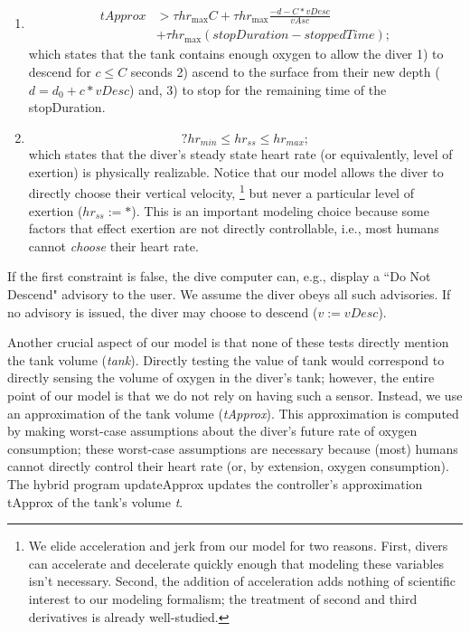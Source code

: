 \documentclass[sigconf,screen]{acmart}
\newcommand{\varheart}{hr}
\newcommand{\vDesc}{\textit{vDesc}}
\newcommand{\vAsc}{\textit{vAsc}}
\newcommand{\tApprox}{\textit{tApprox}}
\newcommand{\iitimes}{{*}}
\begin{document}
\begin{enumerate}
\item 
\begin{align*}
\tApprox &>\tau \varheart_{\text{max}} C + \tau \varheart_{\text{max}}\frac{-d - C \iitimes \vDesc}{\vAsc} \\ &+ \tau \varheart_{\text{max}}(stopDuration - stoppedTime);
\end{align*}
which states that the tank contains enough oxygen to allow the diver
1) to descend for $c \le C$ seconds
2) ascend to the surface from their new depth ($d = d_0 + c\iitimes\vDesc$) and,
3) to stop for the remaining time of the stopDuration.

\item 
$$
?\varheart_{min} \le \varheart_{ss} \le \varheart_{max};
$$
which states that the diver's steady state heart rate (or equivalently, level of exertion) is physically realizable. 
Notice that our model allows the diver to directly choose their vertical velocity,
\footnote[1]{We elide  acceleration and jerk from our model for two reasons.
First, divers can accelerate and decelerate quickly enough that modeling these variables isn't necessary. Second, the addition of acceleration adds nothing of scientific interest to our modeling formalism; the treatment of second and third derivatives is already well-studied.}
but never a particular level of exertion ($\varheart_{ss} := *$).
This is an important modeling choice because some factors
that effect exertion are not directly controllable, i.e., most humans cannot \emph{choose} their heart rate.
\end{enumerate}
If the first constraint is false, the dive computer can, e.g., display a ``Do Not Descend" advisory to the user.
We assume the diver obeys all such advisories. If no advisory is issued, the diver may choose to descend ($v := \vDesc$).

Another crucial aspect of our model is that none of these tests directly mention the tank volume (\textit{tank}). Directly testing the value of tank would correspond to directly sensing the volume of oxygen in the diver's tank; however, the entire point of our model is that we do not rely on having such a sensor. Instead, we use an approximation of the tank volume (\textit{tApprox}). This approximation is computed by making worst-case assumptions about the diver's future rate of oxygen consumption; these worst-case assumptions are necessary because (most) humans cannot directly control their heart rate (or, by extension, oxygen consumption). The hybrid program updateApprox updates the controller's approximation tApprox of the tank's volume \textit{t}.
\end{document}
